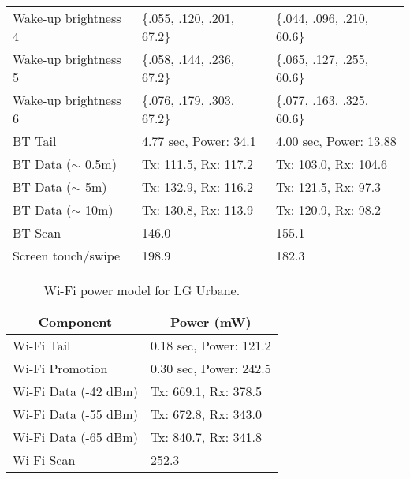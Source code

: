 \begin{table*}[t]
\begin{footnotesize}
\begin{tabular}{l|l|l}
				Wake-up brightness 4        & \{.055, .120, .201, 67.2\}                    &   \{.044, .096, .210, 60.6\}                 \\
				Wake-up brightness 5        & \{.058, .144, .236, 67.2\}                    &   \{.065, .127, .255, 60.6\}                 \\
				Wake-up brightness 6        & \{.076, .179, .303, 67.2\}                    &   \{.077, .163, .325, 60.6\}                 \\
				\hline
				BT Tail                      & 4.77 sec, Power: 34.1                         &   4.00 sec, Power: 13.88           \\
				BT Data ($\sim$ 0.5m)        & Tx: 111.5, Rx: 117.2                          &   Tx: 103.0, Rx: 104.6                       \\
				BT Data ($\sim$ 5m)          & Tx: 132.9, Rx: 116.2                          &   Tx: 121.5, Rx:  97.3                       \\
				BT Data ($\sim$ 10m)         & Tx: 130.8, Rx: 113.9                          &   Tx: 120.9, Rx:  98.2                       \\
				BT Scan                      & 146.0                                         &   155.1                                       \\
				\hline
				Screen touch/swipe           & 198.9                                         &   182.3                                      \\
				\end{tabular}
    \end{footnotesize}
			\label{tab:model}
\end{table*}


\begin{table}[t]
\centering
\footnotesize
\begin{tabular}{l|l}
\multicolumn{1}{c|}{Component}                    & \multicolumn{1}{c}{Power (mW)} \\
\hline
Wi-Fi Tail                   & 0.18 sec, Power: 121.2  \\
Wi-Fi Promotion              & 0.30 sec, Power: 242.5  \\
Wi-Fi Data (-42 dBm)         & Tx: 669.1, Rx: 378.5              \\
Wi-Fi Data (-55 dBm)         & Tx: 672.8, Rx: 343.0              \\
Wi-Fi Data (-65 dBm)         & Tx: 840.7, Rx: 341.8              \\
Wi-Fi Scan                   & 252.3                             \\
\end{tabular}
\caption{\footnotesize Wi-Fi power model for LG Urbane.}
\label{tab:wifi_power}
\end{table}

